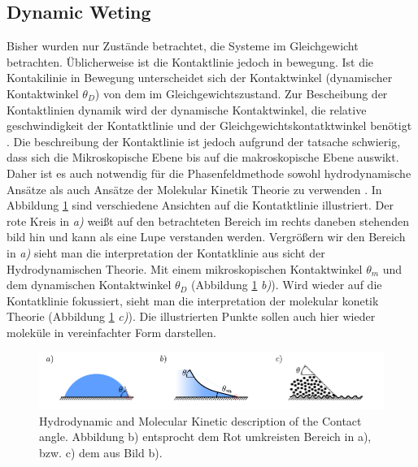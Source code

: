 \subsection{Dynamic Weting}
Bisher wurden nur Zustände betrachtet, die Systeme im Gleichgewicht betrachten. Üblicherweise ist die Kontaktlinie jedoch in bewegung. Ist die Kontakilinie in Bewegung unterscheidet sich der Kontaktwinkel (dynamischer Kontaktwinkel $\theta_D$) von dem im Gleichgewichtszustand\cite{blake2006PhysicsMovingWetting}. Zur Bescheibung der Kontaktlinien dynamik wird der dynamische Kontaktwinkel, die relative geschwindigkeit der Kontatktlinie und der Gleichgewichtskontatktwinkel benötigt \cite{mohammadkarim2022ReviewPhysicsMoving, blake2006PhysicsMovingWetting, cox1986DynamicsSpreadingLiquids}. 
Die beschreibung der Kontaktlinie ist jedoch aufgrund der tatsache schwierig, dass sich die Mikroskopische Ebene bis auf die makroskopische Ebene auswikt. Daher ist es auch notwendig für die Phasenfeldmethode sowohl hydrodynamische Ansätze als auch Ansätze der Molekular Kinetik Theorie zu verwenden \cite{blake2006PhysicsMovingWetting, carlsonCapillarityDynamicWetting2012}.
In Abbildung \ref{fig: HDT_MKT_comp} sind verschiedene Ansichten auf die Kontatktlinie illustriert. Der rote Kreis in \textit{a)} weißt auf den betrachteten Bereich im rechts daneben stehenden bild hin und kann als eine Lupe verstanden werden. Vergrößern wir den Bereich in  \textit{a)} sieht man die interpretation der Kontatklinie aus sicht der Hydrodynamischen Theorie. Mit einem mikroskopischen Kontaktwinkel $\theta_m$ und dem dynamischen Kontaktwinkel $\theta_D$ (Abbildung \ref{fig: HDT_MKT_comp} \textit{b)}). Wird wieder auf die Kontatklinie fokussiert, sieht man die interpretation der molekular konetik Theorie (Abbildung \ref{fig: HDT_MKT_comp} \textit{c)}). Die illustrierten Punkte sollen auch hier wieder moleküle in vereinfachter Form darstellen. 

\begin{figure}[h]
    \centering
    \includegraphics[width=.95\textwidth]{Pictures/ContactAngles_HDT_MKT.pdf}
    \caption{Hydrodynamic and Molecular Kinetic description of the Contact angle. Abbildung b) entsprocht dem Rot umkreisten Bereich in a), bzw. c) dem aus Bild b).}
    \label{fig: HDT_MKT_comp}
\end{figure}
